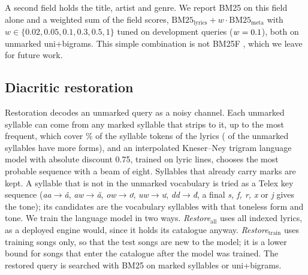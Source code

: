 \documentclass[11pt]{article}
\newcommand{\vi}[1]{\textit{#1}}          %
\begin{document}
A second field holds the title, artist and genre. We report BM25 on this field alone and a weighted sum of
the field scores, $\mathrm{BM25}_{\text{lyrics}} + w\cdot\mathrm{BM25}_{\text{meta}}$ with
$w \in \{0.02, 0.05, 0.1, 0.3, 0.5, 1\}$ tuned on development queries ($w = 0.1$), both on unmarked
uni+bigrams.
This simple combination is not BM25F \citep{robertson2004bm25f}, which we leave for future work.

\subsection{Diacritic restoration}\label{sec:restoration}
Restoration decodes an unmarked query as a noisy channel. Each unmarked syllable can come from any marked
syllable that strips to it, up to the \RestCap{} most frequent, which cover \RestCapCoverage\% of the syllable
tokens of the lyrics (\RestCapTypesOver{} of the \RestUnmarkedTypes{} unmarked syllables have more forms), and an
interpolated Kneser--Ney trigram language
model \citep{kneser1995kn,chen1999smoothing} with absolute discount 0.75, trained on lyric lines, chooses the
most probable sequence with a beam of eight. Syllables that already carry marks are kept. A syllable that is
not in the unmarked vocabulary is tried as a Telex key sequence (\vi{aa}$\rightarrow$\vi{â},
\vi{aw}$\rightarrow$\vi{ă}, \vi{ow}$\rightarrow$\vi{ơ}, \vi{uw}$\rightarrow$\vi{ư}, \vi{dd}$\rightarrow$\vi{đ},
a final \vi{s, f, r, x} or \vi{j} gives the tone); its candidates are the vocabulary syllables with that
toneless form and tone. We train the language model in two ways. \emph{Restore$_{\mathrm{all}}$} uses all
indexed lyrics, as a deployed engine would, since it holds its catalogue anyway. \emph{Restore$_{\mathrm{train}}$}
uses training songs only, so that the test songs are new to the model; it is a lower bound for songs that
enter the catalogue after the model was trained. The restored query is searched with BM25 on marked
syllables or uni+bigrams.
\end{document}
